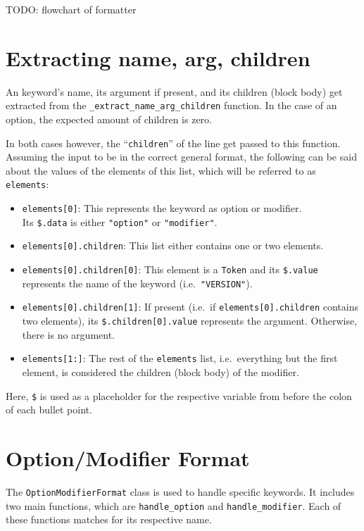 TODO: flowchart of formatter

\section{Extracting name, arg, children}

An keyword's name, its argument if present, and its children (block body) get extracted from the \verb|_extract_name_arg_children| function. In the case of an option, the expected amount of children is zero. 

In both cases however, the ``\verb|children|'' of the line get passed to this function. Assuming the input to be in the correct general format, the following can be said about the values of the elements of this list, which will be referred to as \verb|elements|:

\begin{itemize}
    \item \verb|elements[0]|: This represents the keyword as option or modifier.\\ 
    Its \verb|$.data| is either \verb|"option"| or \verb|"modifier"|.
    \item \verb|elements[0].children|: This list either contains one or two elements.
    \item \verb|elements[0].children[0]|: This element is a \verb|Token| and its \verb|$.value| represents the name of the keyword (i.e.\ \verb|"VERSION"|). 
    \item \verb|elements[0].children[1]|: If present (i.e.\ if \verb|elements[0].children| contains two elements), its \verb|$.children[0].value| represents the argument. Otherwise, there is no argument. 
    \item \verb|elements[1:]|: The rest of the \verb|elements| list, i.e.\ everything but the first element, is considered the children (block body) of the modifier.
\end{itemize}

Here, \verb|$| is used as a placeholder for the respective variable from before the colon of each bullet point.

\section{Option/Modifier Format}

The \verb|OptionModifierFormat| class is used to handle specific keywords. It includes two main functions, which are \verb|handle_option| and \verb|handle_modifier|. Each of these functions matches for its respective name. 


